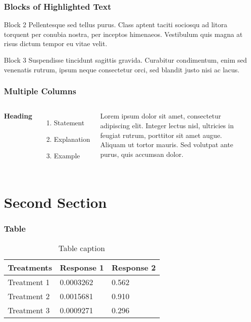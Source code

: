 \begin{frame}
  \frametitle{Blocks of Highlighted Text}


  \begin{block}{Block 2}
    Pellentesque sed tellus purus. Class aptent taciti sociosqu ad litora torquent per conubia nostra, per inceptos himenaeos. Vestibulum quis magna at risus dictum tempor eu vitae velit.
  \end{block}

  \begin{block}{Block 3}
    Suspendisse tincidunt sagittis gravida. Curabitur condimentum, enim sed venenatis rutrum, ipsum neque consectetur orci, sed blandit justo nisi ac lacus.
  \end{block}
\end{frame}


\begin{frame}
  \frametitle{Multiple Columns}
  \begin{columns}[c] %

    \textbf{Heading}
    \begin{enumerate}
      \item Statement
      \item Explanation
      \item Example
    \end{enumerate}

    Lorem ipsum dolor sit amet, consectetur adipiscing elit. Integer lectus nisl, ultricies in feugiat rutrum, porttitor sit amet augue. Aliquam ut tortor mauris. Sed volutpat ante purus, quis accumsan dolor.

  \end{columns}
\end{frame}

\section{Second Section}

\begin{frame}
  \frametitle{Table}
  \begin{table}
    \begin{tabular}{l l l}
      \toprule
      \textbf{Treatments} & \textbf{Response 1} & \textbf{Response 2} \\
      \midrule
      Treatment 1         & 0.0003262           & 0.562               \\
      Treatment 2         & 0.0015681           & 0.910               \\
      Treatment 3         & 0.0009271           & 0.296               \\
      \bottomrule
    \end{tabular}
    \caption{Table caption}
  \end{table}
\end{frame}

